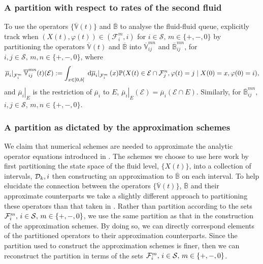 \subsubsection{A partition with respect to rates of the second fluid}
To use the operators \(\{ \overline{\mathbb  V}(t)\}\) and \( \overline{\mathbb  B}\) to analyse the fluid-fluid queue, \cite{bo2014} explicitly track when \((X(t),\varphi(t))\in(\mathcal F_i^m,i)\) for \(i\in\mathcal S,\, m \in \{+,-,0\}\) by partitioning the operators \( \overline{\mathbb  V}(t)\) and \( \overline{\mathbb  B}\) into \( \overline{\mathbb  V}_{ij}^{m n}\) and \( \overline{\mathbb  B}_{ij}^{m n}\), for \(i,j\in\mathcal S,\, m,n\in \{+,-,0\}\), where
\[\left.\overline\mu_i\right|_{\mathcal{F}_i^m}  \overline{\mathbb  V}_{ij}^{m n}(t)(\mathcal{E}) := \int_{x\in[0,b]} \left. \, \mathrm{d} \overline\mu_i\right|_{\mathcal{F}_i^m}(x)\mathbb P (X(t) \in\mathcal{E}\cap \mathcal{F}_j^n,\varphi(t) = j \mid X(0) = x, \varphi(0) = i),\]
and \(\left.\overline\mu_i\right|_{E}\) is the restriction of \(\overline\mu_i\) to \(E\), \(\left.\overline\mu_i\right|_{E}(\mathcal E)=\overline\mu_i(\mathcal E\cap E)\). Similarly, for \( \overline{\mathbb  B}_{ij}^{m n},\) \(i,j\in\mathcal S,\, m,n\in \{+,-,0\}\).

\subsubsection{A partition as dictated by the approximation schemes}
We claim that numerical schemes are needed to approximate the analytic operator equations introduced in \cite{bo2014}. The schemes we choose to use here work by first partitioning the state space of the fluid level, \(\{X(t)\}\), into a collection of intervals, \({\mathcal{D}_k,i}\) then constructing an approximation to \(\overline{\mathbb B}\) on each interval. To help elucidate the connection between the operators \(\{ \overline{\mathbb  V}(t)\}\), \( \overline{\mathbb  B}\) and their approximate counterparts we take a slightly different approach to partitioning these operators than that taken in \cite{bo2014}. Rather than partition according to the sets \(\mathcal{F}_i^m,\,i\in\mathcal{S},\,m\in\{+,-,0\}\), we use the same partition as that in the construction of the approximation schemes. By doing so, we can directly correspond elements of the partitioned operators to their approximation counterparts. Since the partition used to construct the approximation schemes is finer, then we can reconstruct the partition in terms of the sets \(\mathcal{F}_i^m,\,i\in\mathcal{S},\,m\in\{+,-,0\}\). 

